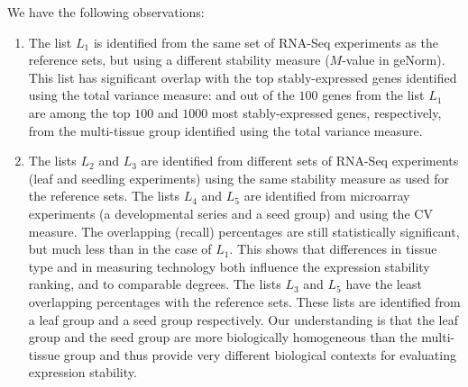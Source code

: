 	We have the following observations:
	\begin{enumerate}
		\item
		The list $L_1$ is identified from the same set of RNA-Seq experiments as the
		reference sets, but using a different stability measure ($M$-value in
		geNorm). This list has significant overlap with the top
		stably-expressed genes identified using the total variance measure:
		\recalltophundred and \recalltopthousand out of the $100$ genes from the list $L_1$ are 
		among the
		top $100$ and $1000$ most stably-expressed genes, respectively, from the
		multi-tissue group identified using the total variance measure. 
		\item
		The lists $L_2$ and $L_3$ are identified from different sets of
		RNA-Seq experiments (leaf and seedling experiments) using the same
		stability measure as used for the reference sets. The lists $L_4$ and $L_5$ are
		identified from microarray experiments (a developmental series and a
		seed group) and using the CV measure. The overlapping (recall)
		percentages are still statistically significant, but much less than in
		the case of $L_1$.  This shows that differences in tissue type and in
		measuring technology both influence the expression stability ranking,
		and to comparable degrees. The lists $L_3$ and $L_5$ have the least
		overlapping percentages with the reference sets. These lists are
		identified from a leaf group and a seed group respectively.
		Our understanding is that the leaf group and the seed group are more
		biologically homogeneous than the multi-tissue group and thus provide
		very different biological contexts for evaluating expression stability.
	\end{enumerate}
	
	
	
